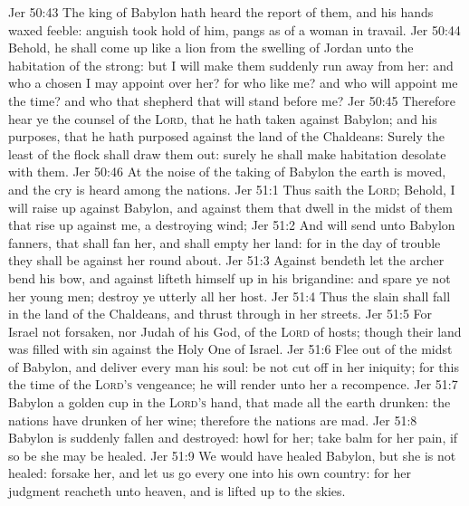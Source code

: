 \vs Jer 50:43 The king of Babylon hath heard the report of them, and his hands waxed feeble: anguish took hold of him,  pangs as of a woman in travail.
\vs Jer 50:44 Behold, he shall come up like a lion from the swelling of Jordan unto the habitation of the strong: but I will make them suddenly run away from her: and who  a chosen  I may appoint over her? for who  like me? and who will appoint me the time? and who  that shepherd that will stand before me?
\vs Jer 50:45 Therefore hear ye the counsel of the \textsc{Lord}, that he hath taken against Babylon; and his purposes, that he hath purposed against the land of the Chaldeans: Surely the least of the flock shall draw them out: surely he shall make  habitation desolate with them.
\vs Jer 50:46 At the noise of the taking of Babylon the earth is moved, and the cry is heard among the nations.
\vs Jer 51:1 Thus saith the \textsc{Lord}; Behold, I will raise up against Babylon, and against them that dwell in the midst of them that rise up against me, a destroying wind;
\vs Jer 51:2 And will send unto Babylon fanners, that shall fan her, and shall empty her land: for in the day of trouble they shall be against her round about.
\vs Jer 51:3 Against  bendeth let the archer bend his bow, and against  lifteth himself up in his brigandine: and spare ye not her young men; destroy ye utterly all her host.
\vs Jer 51:4 Thus the slain shall fall in the land of the Chaldeans, and  thrust through in her streets.
\vs Jer 51:5 For Israel  not  forsaken, nor Judah of his God, of the \textsc{Lord} of hosts; though their land was filled with sin against the Holy One of Israel.
\vs Jer 51:6 Flee out of the midst of Babylon, and deliver every man his soul: be not cut off in her iniquity; for this  the time of the \textsc{Lord's} vengeance; he will render unto her a recompence.
\vs Jer 51:7 Babylon  a golden cup in the \textsc{Lord's} hand, that made all the earth drunken: the nations have drunken of her wine; therefore the nations are mad.
\vs Jer 51:8 Babylon is suddenly fallen and destroyed: howl for her; take balm for her pain, if so be she may be healed.
\vs Jer 51:9 We would have healed Babylon, but she is not healed: forsake her, and let us go every one into his own country: for her judgment reacheth unto heaven, and is lifted up  to the skies.
